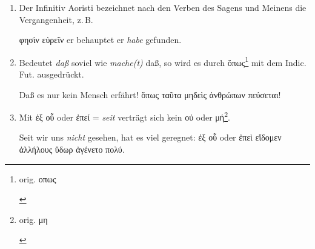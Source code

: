 \begin{enumerate}[leftmargin=0pt,rightmargin=0pt,listparindent =1cm,labelindent=1cm,labelsep=1ex,labelwidth={*},itemindent={*},align=left]
\begin{continuousexamples}
Ja, ich \emph{habe} es gefunden (\textlatin{sc.} nunmehr) \textgreek[variant=ancient]{εὕρηκανὴ
Δία.}


Wo \emph{hast} du es gefunden? (\textlatin{sc.} damals als du es fandest)
\textgreek[variant=ancient]{ποῦ εὗρες;}


Ich \emph{habe} es (\textlatin{sc.} damals) in dem Garden gefunden
\textgreek[variant=ancient]{ἐν τῷ κήπῳ εὗρον. }\par\end{continuousexamples}

\item Der Infinitiv Aoristi bezeichnet nach den Verben des Sagens und Meinens
die Vergangenheit, z.\,B.


\begin{continuousexamples}\textgreek[variant=ancient]{φησὶν εὑρεῖν}
er behauptet er \emph{habe} gefunden.\par\end{continuousexamples}

\item Bedeutet \emph{daß} soviel wie \emph{mache(t)} daß, so wird es durch
\textgreek[variant=ancient]{ὅπως}\footnote{\begin{latin}%
orig. \textgreek[variant=ancient]{οπως}\end{latin}%
} mit dem \textlatin{Indic. Fut.} ausgedrückt.


\begin{continuousexamples}Daß es nur kein Mensch erfährt! \textgreek[variant=ancient]{ὅπως
ταῦτα μηδεὶς ἀνθρώπων πεύσεται!}\par\end{continuousexamples}

\item Mit \textgreek[variant=ancient]{ἐξ οὗ} oder \textgreek[variant=ancient]{ἐπεί}
= \emph{seit} verträgt sich kein \textgreek[variant=ancient]{οὐ} oder
\textgreek[variant=ancient]{μή}\footnote{\begin{latin}%
orig. \textgreek[variant=ancient]{μη}\end{latin}%
}\textgreek[variant=ancient]{.}


\begin{continuousexamples}Seit wir uns \emph{nicht} gesehen, hat
es viel geregnet: \textgreek[variant=ancient]{ἐξ οὗ }oder\textgreek[variant=ancient]{
ἐπεὶ εἴδομεν ἀλλήλους ὕδωρ ἀγένετο πολύ.}\par\end{continuousexamples}


\end{enumerate}
